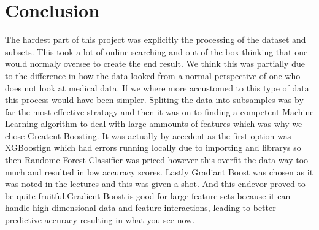 \documentclass{article}
\begin{document}
\section{Conclusion}

The hardest part of this project was explicitly the processing of the dataset and subsets. This took a lot of online searching and out-of-the-box thinking that one would normaly oversee to create the end result. We think this was partially due to the difference in how the data looked from a normal perspective of one who does not look at medical data. If we where more accustomed to this type of data this process would have been simpler. Spliting the data into subsamples was by far the most effective stratagy and then it was on to finding a competent Machine Learning algorithm to deal with large ammounts of features which was why we chose Greatent Boosting. It was actually by accedent as the first option was XGBoostign which had errors running locally due to importing and librarys so then Randome Forest Classifier was priced however this overfit the data way too much and resulted in low accuracy scores. Lastly Gradiant Boost was chosen as it was noted in the lectures and this was given a shot. And this endevor proved to be quite fruitful.Gradient Boost is good for large feature sets because it can handle high-dimensional data and feature interactions, leading to better predictive accuracy resulting in what you see now. 
\end{document}
